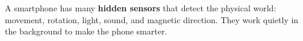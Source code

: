 \sectionrule

\begin{bigidea}
  A smartphone has many \textbf{hidden sensors} that detect the physical world:
  movement, rotation, light, sound, and magnetic direction.
  They work quietly in the background to make the phone smarter.
\end{bigidea}

